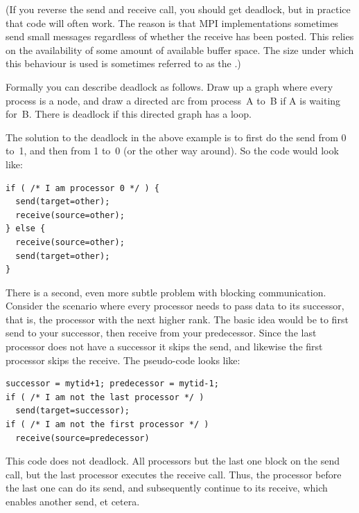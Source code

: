(If you reverse the send and receive call, you should get deadlock,
but in practice that code will often work. The reason is that
MPI implementations sometimes send small messages regardless of whether
the receive has been posted. This relies on the availability of
some amount of available buffer space. The size under which this behaviour
is used is sometimes referred to as the .)

Formally you can describe deadlock as follows. Draw up a graph where
every process is a node, and draw a directed arc from process~A to~B if
A is waiting for~B. There is deadlock if this directed graph has a
loop.

The solution to the deadlock in the above example
is to first do the send from 0 to~1, and then from 1 to~0 (or the other way around). So the code would look like:
\begin{verbatim}
if ( /* I am processor 0 */ ) {
  send(target=other);
  receive(source=other);
} else {
  receive(source=other);
  send(target=other);
}
\end{verbatim}

There is a second, even more subtle problem with blocking
communication. Consider the scenario where every processor needs to
pass data to its successor, that is, the processor with the next
higher rank. The basic idea would be to first send to your successor,
then receive from your predecessor. Since the last processor does not
have a successor it skips the send, and likewise the first processor
skips the receive. The pseudo-code looks like:
\begin{verbatim}
successor = mytid+1; predecessor = mytid-1;
if ( /* I am not the last processor */ )
  send(target=successor);
if ( /* I am not the first processor */ )
  receive(source=predecessor)
\end{verbatim}
This code does not deadlock. All processors but the last one block on
the send call, but the last processor executes the receive call. Thus,
the processor before the last one can do its send, and subsequently
continue to its receive, which enables another send, et cetera.

